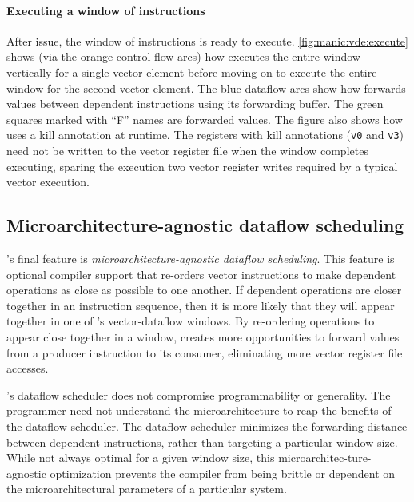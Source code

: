 \paragraph{Executing a window of instructions}
After issue, the window of instructions is ready to execute.
\autoref{fig:manic:vde:execute} shows (via the orange control-flow arcs) how \manic
executes the entire window vertically for a single vector element before moving
on to execute the entire window for the second vector element.
%
The blue dataflow arcs show how \manic forwards values between dependent
instructions using its forwarding buffer.  The green squares marked with ``F'' names
are forwarded values.
%
The figure also shows how \manic uses a kill annotation at runtime.
%
The registers with kill annotations ({\tt v0} and {\tt v3}) need not be written
to the vector register file when the window completes executing, sparing the
execution two vector register writes required by a typical vector execution. 

\subsection{Microarchitecture-agnostic dataflow scheduling}
\label{manic:design:schedule}
\manic's final feature is {\em microarchitecture-agnostic
dataflow scheduling}.
%
This feature is optional compiler support that
re-orders vector instructions to make dependent operations as close as possible to one another.  If dependent operations are closer together in an instruction
sequence, then it is more likely that they will appear together in one of
\manic's vector-dataflow windows.  By re-ordering operations to appear close
together in a window, \manic creates more opportunities to
forward values from a producer instruction to its consumer,
eliminating more vector register file accesses.

\manic's dataflow scheduler does not compromise programmability or generality.
The programmer need not understand the microarchitecture to reap the benefits
of the dataflow scheduler.  The dataflow scheduler minimizes the forwarding
distance between dependent instructions, rather than targeting a particular
window size.  While not always optimal for a given window size, this
microarchitec-ture-agnostic optimization prevents the compiler from being
brittle or dependent on the microarchitectural parameters of a
particular system. 

